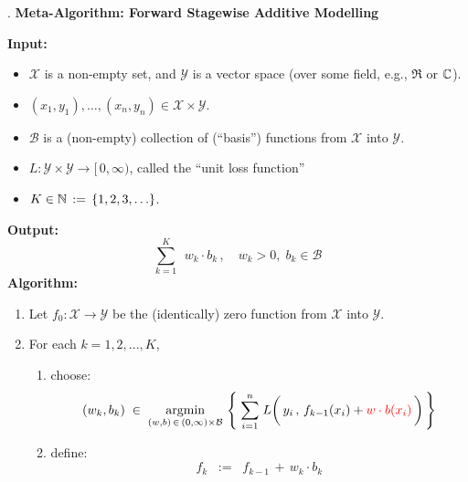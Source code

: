 \begin{center}
\begin{minipage}{6in}
\begin{tcolorbox}[width=0.95\linewidth,colback=white,colframe=gray]
	\begin{center}
	{\color{white}.}\vskip 0.1cm
	\textbf{\large Meta-Algorithm: Forward Stagewise Additive Modelling}
	\end{center}
	\textbf{Input:}
	\begin{itemize}
	\item
		$\mathcal{X}$ is a non-empty set, and $\mathcal{Y}$ is a vector space (over some field, e.g., $\Re$ or $\mathbb{C}$).
	\item
		$(x_{1},y_{1}), \ldots, (x_{n},y_{n}) \in \mathcal{X} \times \mathcal{Y}$.
	\item
		$\mathcal{B}$ is a (non-empty) collection of (``basis'') functions from $\mathcal{X}$ into $\mathcal{Y}$.
	\item
		$L : \mathcal{Y} \times \mathcal{Y} \longrightarrow [\,0,\infty)$, called the ``unit loss function''
	\item
		$K \in \mathbb{N} \,:=\, \{1,2,3,\ldots\}$.
	\end{itemize}
	\textbf{Output:}
	\begin{equation*}
	\overset{K}{\underset{k = 1}{\sum}}\;\,w_{k} \cdot b_{k}\,,
	\quad
	w_{k} > 0,\; b_{k} \in \mathcal{B} 
	\end{equation*}
	\textbf{Algorithm:}
	\begin{enumerate}
	\item
		Let $f_{0} : \mathcal{X} \longrightarrow \mathcal{Y}$ be the (identically) zero function from $\mathcal{X}$ into $\mathcal{Y}$.
	\item
		For each $k = 1, 2, ... , K$, 
		\begin{enumerate}
		\item
			choose:
			\begin{equation*}
			(w_{k},b_{k})
			\;\in\;
				\underset{(w,b)\,\in\,(0,\infty)\times\mathcal{B}}{\argmin}\,
				\left\{\;
					\overset{n}{\underset{i=1}{\sum}}\;
					L\!\left(\,y_{i}\,,\,f_{k-1}(x_{i}) \overset{{\color{white}1}}{+} {\color{red}w \cdot b(x_{i})}\,\right)
					\,\right\}
			\end{equation*}
		\item
			define:
			\begin{equation*}
			f_{k} \;\; := \;\; f_{k-1} \,+\, w_{k} \cdot b_{k}
			\end{equation*}
		\end{enumerate}
	\end{enumerate}
\end{tcolorbox}
\end{minipage}
\end{center}

\renewcommand{\theenumi}{\roman{enumi}}
\renewcommand{\labelenumi}{\textnormal{(\theenumi)}$\;\;$}

